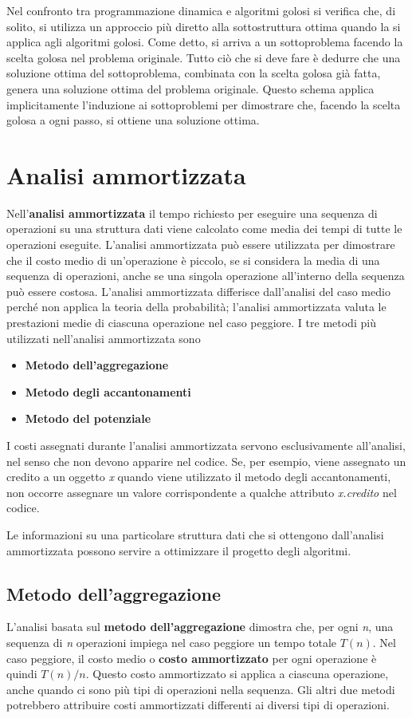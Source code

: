 \documentclass[10pt, a4paper]{report}
\begin{document}
Nel confronto tra programmazione dinamica e algoritmi golosi si verifica che, di solito, si utilizza un approccio più diretto alla sottostruttura ottima quando la si applica agli algoritmi golosi. Come detto, si arriva a un sottoproblema facendo la scelta golosa nel problema originale. Tutto ciò che si deve fare è dedurre che una soluzione ottima del sottoproblema, combinata con la scelta golosa già fatta, genera una soluzione ottima del problema originale. Questo schema applica implicitamente l'induzione ai sottoproblemi per dimostrare che, facendo la scelta golosa a ogni passo, si ottiene una soluzione ottima.
\chapter{Analisi ammortizzata}
Nell'\textbf{analisi ammortizzata} il tempo richiesto per eseguire una sequenza di operazioni su una struttura dati viene calcolato come media dei tempi di tutte le operazioni eseguite. L'analisi ammortizzata può essere utilizzata per dimostrare che il costo medio di un'operazione è piccolo, se si considera la media di una sequenza di operazioni, anche se una singola operazione all'interno della sequenza può essere costosa. L'analisi ammortizzata differisce dall'analisi del caso medio perché non applica la teoria della probabilità; l'analisi ammortizzata valuta le prestazioni medie di ciascuna operazione nel caso peggiore. I tre metodi più utilizzati nell'analisi ammortizzata sono
\begin{itemize}
\item \textbf{Metodo dell'aggregazione}
\item \textbf{Metodo degli accantonamenti}
\item \textbf{Metodo del potenziale}
\end{itemize}
I costi assegnati durante l'analisi ammortizzata servono esclusivamente all'analisi, nel senso che non devono apparire nel codice. Se, per esempio, viene assegnato un credito a un oggetto \textit{x} quando viene utilizzato il metodo degli accantonamenti, non occorre assegnare un valore corrispondente a qualche attributo \textit{x.credito} nel codice.

Le informazioni su una particolare struttura dati che si ottengono dall'analisi ammortizzata possono servire a ottimizzare il progetto degli algoritmi.
\section{Metodo dell'aggregazione}
L'analisi basata sul \textbf{metodo dell'aggregazione} dimostra che, per ogni \textit{n}, una sequenza di \textit{n} operazioni impiega nel caso peggiore un tempo totale $T(n)$. Nel caso peggiore, il costo medio o \textbf{costo ammortizzato} per ogni operazione è quindi $T(n)/n$. Questo costo ammortizzato si applica a ciascuna operazione, anche quando ci sono più tipi di operazioni nella sequenza. Gli altri due metodi potrebbero attribuire costi ammortizzati differenti ai diversi tipi di operazioni.\\
\end{document}
